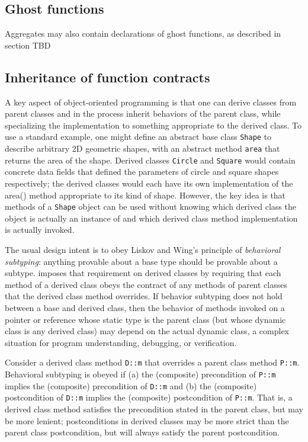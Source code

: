 \subsection{Ghost functions}
Aggregates may also contain declarations of ghost functions, as described in section TBD 


\subsection{Inheritance of function contracts}

A key aspect of object-oriented programming is 
that one can derive classes from parent classes and in 
the process inherit behaviors of the parent class, 
while specializing the implementation to something appropriate to the derived class. 
To use a standard example, 
one might define an abstract base class \lstinline|Shape| to describe arbitrary 2D geometric shapes, 
with an abstract method 
\lstinline|area| that returns the area of the shape. 
Derived classes \lstinline|Circle| and \lstinline|Square| would contain concrete data fields that defined the parameters of circle and square shapes respectively; 
the derived classes would each have its own implementation of the area() method appropriate to its kind of shape. 
However, the key idea is that methods of a \lstinline|Shape| object can be used without knowing which derived class the object is actually an instance of and
which derived class method implementation is actually invoked.

The usual design intent is to obey Liskov and Wing's principle of \textit{behavioral subtyping}\cite{Liskov:1994:BNS:197320.197383}: 
anything provable about a base type should be provable about a subtype.
\NAME imposes that requirement on derived classes by 
requiring that each method of a derived class obeys the contract of any methods of parent classes that the derived class method overrides. 
If behavior subtyping does not hold between a base and derived class, then the behavior of methods
invoked on a pointer or reference whose static type is the
parent class (but whose dynamic class is any derived class) may depend on the actual dynamic class, 
a complex situation for program understanding, debugging, or verification.

Consider a derived class method \lstinline|D::m| that overrides a parent class method \lstinline|P::m|.
Behavioral subtyping is obeyed if (a) the (composite) precondition of
\lstinline|P::m| implies the (composite) precondition of 
\lstinline|D::m| and (b) the (composite) postcondition of
\lstinline|D::m| implies the (composite) postcondition of 
\lstinline|P::m|. That is, a derived class method satisfies the precondition stated in the parent class, but may be more lenient; 
postconditions in derived classes may be more strict than the parent class postcondition, but will always 
satisfy the parent postcondition. 

